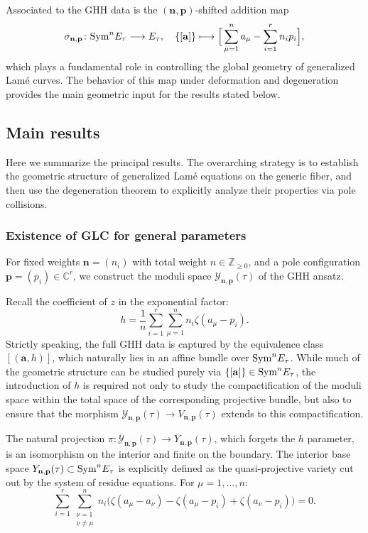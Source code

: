 \documentclass[11pt]{amsart}
\theoremstyle{remark}
\numberwithin{equation}{section}
\newcommand{\Sym}{{\rm Sym}}
\begin{document}
Associated to the GHH data is the $(\mathbf{n},\mathbf{p})$-shifted addition map
\begin{equation}\label{eq:summation_intro}
\sigma_{\mathbf{n},\mathbf{p}} \colon \Sym^n E_\tau \longrightarrow E_\tau, \quad \{[\mathbf{a}]\} \longmapsto \Big[\sum_{\mu=1}^n a_\mu - \sum_{i=1}^r n_i p_i \Big],
\end{equation}
which plays a fundamental role in controlling the global geometry of generalized Lam\'e curves. The behavior of this map under deformation and degeneration provides the main geometric input for the results stated below.

\subsection{Main results} 
Here we summarize the principal results. The overarching strategy is to establish the geometric structure of generalized Lam\'e equations on the generic fiber, and then use the degeneration theorem to explicitly analyze their properties via pole collisions.

\subsubsection{Existence of GLC for general parameters}
For fixed weights $\mathbf{n} = (n_i)$ with total weight $n \in \mathbb{Z}_{\geq 0}$, and a pole configuration $\mathbf{p} = (p_i) \in \mathbb{C}^r$, we construct the moduli space $\mathcal{Y}_{\mathbf{n},\mathbf{p}}(\tau)$ of the GHH ansatz. 

Recall the coefficient of $z$ in the exponential factor:
\[
h = \frac{1}{n}\sum_{i=1}^r \sum_{\mu=1}^n n_i\zeta(a_\mu-p_i).
\]
Strictly speaking, the full GHH data is captured by the equivalence class $[(\mathbf{a}, h)]$, which naturally lies in an affine bundle over $\Sym^n E_\tau$. While much of the geometric structure can be studied purely via $\{[\mathbf{a}]\} \in \Sym^n E_\tau$, the introduction of $h$ is required not only to study the compactification of the moduli space within the total space of the corresponding projective bundle, but also to ensure that the morphism $\mathcal{Y}_{\mathbf{n},\mathbf{p}}(\tau) \to V_{\mathbf{n},\mathbf{p}}(\tau)$ extends to this compactification.

The natural projection $\pi \colon \overline{\mathcal{Y}}_{\mathbf{n},\mathbf{p}}(\tau) \to \overline{Y}_{\mathbf{n},\mathbf{p}}(\tau)$, which forgets the $h$ parameter, is an isomorphism on the interior and finite on the boundary. The interior base space $Y_{\mathbf{n},\mathbf{p}}(\tau) \subset \Sym^n E_\tau$ is explicitly defined as the quasi-projective variety cut out by the system of residue equations. For $\mu = 1, \dots, n$:
\begin{equation}
\sum_{i=1}^{r} \sum_{\substack{\nu=1 \\ \nu \neq \mu}}^{n} n_{i} \Big( \zeta(a_{\mu} - a_{\nu}) - \zeta(a_{\mu} - p_{i}) + \zeta(a_{\nu} - p_{i}) \Big) = 0.
\end{equation}
\end{document}
